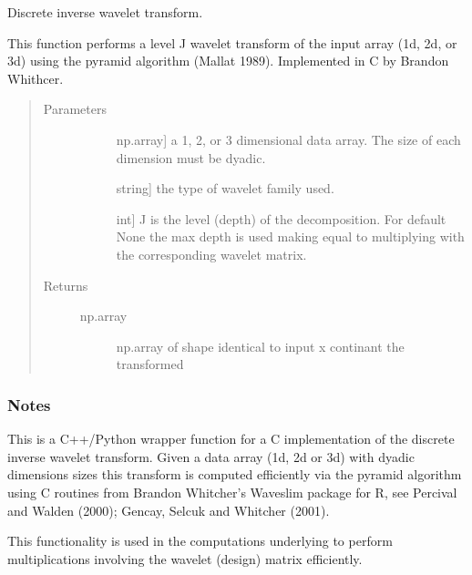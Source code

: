 \documentclass[letterpaper,10pt,english]{sphinxmanual}
\begin{document}
\begin{fulllineitems}
\label{\detokenize{pysmme:pysmme.transforms.iwt}}
\sphinxAtStartPar
Discrete inverse wavelet transform.

\sphinxAtStartPar
This function performs a level J wavelet transform of the input array (1d, 2d, or 3d) 
using the pyramid algorithm (Mallat 1989). Implemented in C by Brandon Whithcer.
\begin{quote}\begin{description}
\item[{Parameters}] \leavevmode\begin{description}
\item[{}] \leavevmode{[}np.array{]}
\sphinxAtStartPar
a 1, 2, or 3 dimensional data array. The size of each dimension must be dyadic.

\item[{}] \leavevmode{[}string{]}
\sphinxAtStartPar
the type of wavelet family used.

\item[{}] \leavevmode{[}int{]}
\sphinxAtStartPar
J is the level (depth) of the decomposition. For default None the max
depth is used making   equal to multiplying  with the
corresponding wavelet matrix.

\end{description}

\item[{Returns}] \leavevmode\begin{description}
\item[{np.array}] \leavevmode
\sphinxAtStartPar
np.array of shape identical to input x continant the transformed

\end{description}

\end{description}\end{quote}
\subsubsection*{Notes}

\sphinxAtStartPar
This is a C++/Python wrapper function for a C implementation of the
discrete inverse wavelet transform. Given a data array (1d, 2d or 3d) with dyadic
dimensions sizes this transform is computed efficiently via the pyramid
algorithm using C routines from  Brandon Whitcher’s Waveslim package for R, see
Percival and Walden (2000); Gencay, Selcuk and Whitcher (2001).

\sphinxAtStartPar
This functionality is used in the computations underlying 
to perform multiplications involving the wavelet (design) matrix efficiently.

\end{fulllineitems}
\end{document}
